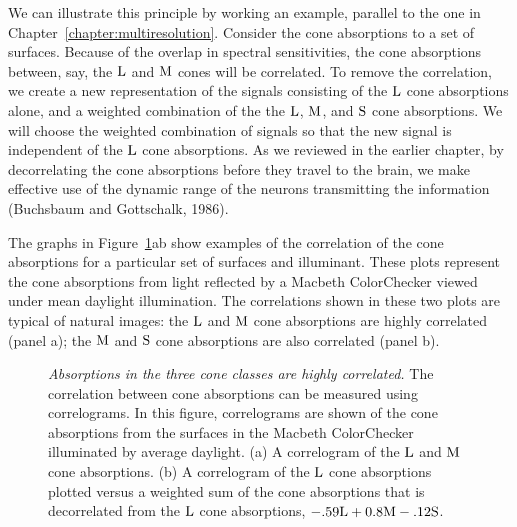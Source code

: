 We can illustrate this principle by working an example, parallel to
the one in Chapter~\ref{chapter:multiresolution}.  Consider the cone
absorptions to a set of surfaces.  Because of the overlap in spectral
sensitivities, the cone absorptions between, say, the $\mbox{L}$ and
$\mbox{M}$ cones will be correlated.  To remove the correlation, we
create a new representation of the signals consisting of the $\mbox{L}$
cone absorptions alone, and a weighted combination of the the $\mbox{L}$,
$\mbox{M}$, and $\mbox{S}$ cone absorptions.  We will choose the weighted
combination of signals so that the new signal is independent of the
$\mbox{L}$ cone absorptions.  As we reviewed in the earlier chapter, by
decorrelating the cone absorptions before they travel to the brain, we
make effective use of the dynamic range of the neurons transmitting
the information (Buchsbaum and Gottschalk, 1986).

The graphs in Figure~\ref{f8:decor}ab show examples of the correlation
of the cone absorptions for a particular set of surfaces and
illuminant.  These plots represent the cone absorptions from light
reflected by a Macbeth ColorChecker viewed under mean daylight
illumination.  The correlations shown in these two plots are typical
of natural images: the $\mbox{L}$ and $\mbox{M}$ cone absorptions are highly
correlated (panel a); the $\mbox{M}$ and $\mbox{S}$ cone absorptions are
also correlated (panel b).
\begin{figure}
\centerline{
}
\caption[Cross Correlation]{
{\em Absorptions in the three cone classes are highly correlated.}
The correlation between cone absorptions can be measured using
correlograms.  In this figure, correlograms are shown of the cone
absorptions from the surfaces in the Macbeth ColorChecker illuminated
by average daylight.  (a) A correlogram of the $\mbox{L}$ and $\mbox{M}$
cone absorptions.  (b) A correlogram of the $\mbox{L}$ cone absorptions
plotted versus a weighted sum of the cone absorptions that is
decorrelated from the $\mbox{L}$ cone absorptions, $ -.59 \mbox{L} + 0.8
\mbox{M} - .12 \mbox{S}$. }
\label{f8:decor}
\end{figure}

